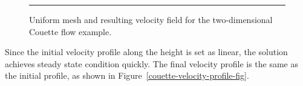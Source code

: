 \begin{figure}[htbp]
 \centering
 \rule{2mm}{0mm}
 \caption{Uniform mesh and resulting velocity field for the two-dimensional Couette flow example.}
 \label{couette-mesh-and-velocity-fig}
\end{figure}

Since the initial velocity profile along the height is set as linear, 
the solution achieves steady state condition quickly.
The final velocity profile is the same as the initial profile, 
as shown in Figure~\ref{couette-velocity-profile-fig}.

